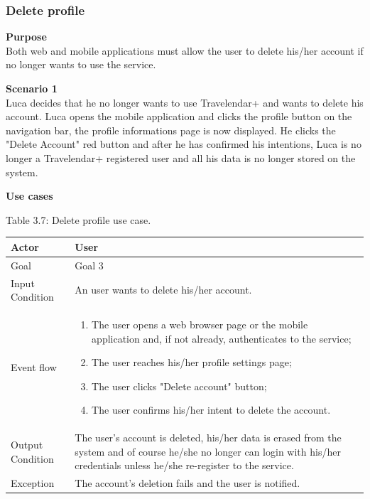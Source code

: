\documentclass{article}
\begin{document}
	\subsubsection{Delete profile}
	
	\bigskip
	\noindent
	\textbf{Purpose} \\
	Both web and mobile applications must allow the user to delete his/her account if no longer wants to use the service.
	
	\bigskip
	\noindent
	\textbf{Scenario 1} \\
	Luca decides that he no longer wants to use Travelendar+ and wants to delete his account. Luca opens the mobile application and clicks the profile button on the navigation bar, the profile informations page is now displayed. He clicks the "Delete Account" red button and after he has confirmed his intentions, Luca is no longer a Travelendar+ registered user and all his data is no longer stored on the system.
	
	\bigskip
	\noindent
	\textbf{Use cases} \\
	
	\begin{center}
		Table 3.7: Delete profile use case.
		
		\bigskip
    			\begin{tabular}{p{}|p{}}
   		 	\hline
    			Actor & User \\ \hline
    			Goal & Goal 3 \\ \hline
    			Input Condition & An user wants to delete his/her account. \\ \hline
    			Event flow & 
			\begin{enumerate}
  				\item The user opens a web browser page or the mobile application and, if not already, authenticates to the service;
  				\item The user reaches his/her profile settings page;
  				\item The user clicks "Delete account" button;
  				\item The user confirms his/her intent to delete the account.
 			 \end{enumerate} \\ \hline
    			Output Condition & The user's account is deleted, his/her data is erased from the system and of course he/she no longer can login with his/her credentials unless he/she re-register to the service. \\ \hline
    			Exception & The account's deletion fails and the user is notified. \\
    			\hline
    		\end{tabular}
	\end{center}
	
\end{document}
